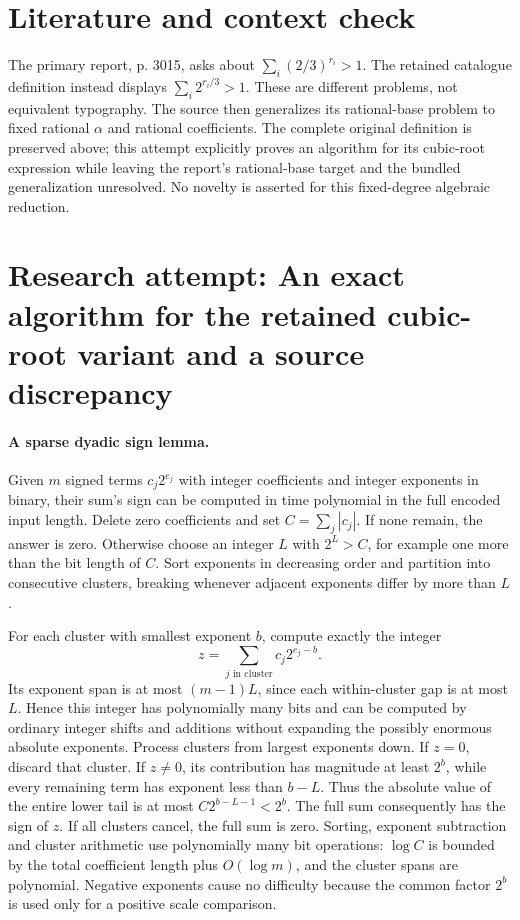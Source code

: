 \documentclass[11pt]{article}
\begin{document}
\section{Literature and context check}
The primary report, p. 3015, asks about $\sum_i(2/3)^{r_i}>1$. The retained catalogue definition instead displays $\sum_i2^{r_i/3}>1$. These are different problems, not equivalent typography. The source then generalizes its rational-base problem to fixed rational $\alpha$ and rational coefficients. The complete original definition is preserved above; this attempt explicitly proves an algorithm for its cubic-root expression while leaving the report's rational-base target and the bundled generalization unresolved. No novelty is asserted for this fixed-degree algebraic reduction.
\section{Research attempt: An exact algorithm for the retained cubic-root variant and a source discrepancy}
\paragraph{A sparse dyadic sign lemma.}
Given $m$ signed terms $c_j2^{e_j}$ with integer coefficients and integer exponents in binary, their sum's sign can be computed in time polynomial in the full encoded input length. Delete zero coefficients and set $C=\sum_j|c_j|$. If none remain, the answer is zero. Otherwise choose an integer $L$ with $2^L>C$, for example one more than the bit length of $C$. Sort exponents in decreasing order and partition into consecutive clusters, breaking whenever adjacent exponents differ by more than $L$.

For each cluster with smallest exponent $b$, compute exactly the integer
\[
z=\sum_{j\text{ in cluster}}c_j2^{e_j-b}.
\]
Its exponent span is at most $(m-1)L$, since each within-cluster gap is at most $L$. Hence this integer has polynomially many bits and can be computed by ordinary integer shifts and additions without expanding the possibly enormous absolute exponents. Process clusters from largest exponents down. If $z=0$, discard that cluster. If $z\ne0$, its contribution has magnitude at least $2^b$, while every remaining term has exponent less than $b-L$. Thus the absolute value of the entire lower tail is at most $C2^{b-L-1}<2^b$. The full sum consequently has the sign of $z$. If all clusters cancel, the full sum is zero. Sorting, exponent subtraction and cluster arithmetic use polynomially many bit operations: $\log C$ is bounded by the total coefficient length plus $O(\log m)$, and the cluster spans are polynomial. Negative exponents cause no difficulty because the common factor $2^b$ is used only for a positive scale comparison.
\end{document}
